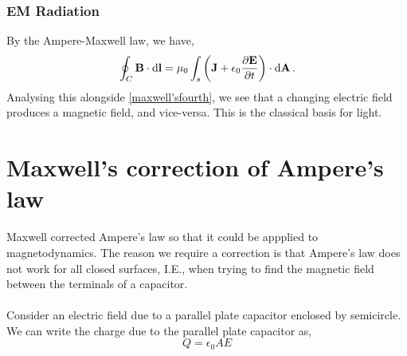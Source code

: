 \documentclass{book}
\begin{document}
\subsubsection{EM Radiation}
By the Ampere-Maxwell law, we have,
\begin{equation}
    \oint_C \vb{B}\cdot\dd{\vb{l}} = \mu_0 \int_s\left(\vb{J}+\epsilon_0\pdv{\vb{E}}{t}\right)\cdot\dd{\vb{A}}.
\end{equation}
Analysing this alongside \eqref{maxwell'sfourth}, we see that a changing electric field produces a magnetic field, and vice-versa. This is the classical basis for light.
\section{Maxwell's correction of Ampere's law}
\begin{figure}
	\centering
\end{figure}
Maxwell corrected Ampere's law so that it could be appplied to magnetodynamics. The reason we require a correction is that Ampere's law does not work for all closed surfaces, I.E., when trying to find the magnetic field between the terminals of a capacitor.
\\\\
Consider an electric field due to a parallel plate capacitor enclosed by semicircle. We can write the charge due to the parallel plate capacitor as,
\begin{equation}
	Q = \epsilon_0 A E
\end{equation}
\end{document}
